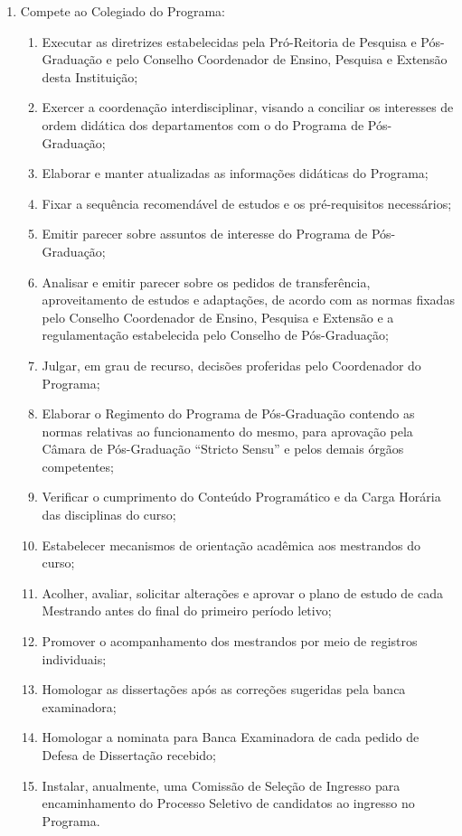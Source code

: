 \documentclass{article}
\begin{document}
\begin{enumerate}
	\item Compete ao Colegiado do Programa:
	\begin{enumerate}
		\item Executar as diretrizes estabelecidas pela Pró-Reitoria de Pesquisa e Pós-Graduação e pelo Conselho Coordenador de Ensino, Pesquisa e Extensão desta Instituição;
		\item Exercer a coordenação interdisciplinar, visando a conciliar os interesses de ordem didática dos departamentos com o do Programa de Pós-Graduação;	%
		\item Elaborar e manter atualizadas as informações didáticas do Programa;
		\item Fixar a sequência recomendável de estudos e os pré-requisitos necessários;
		\item Emitir parecer sobre assuntos de interesse do Programa de Pós-Graduação;
		\item Analisar e emitir parecer sobre os pedidos de transferência, aproveitamento de estudos e adaptações, de acordo com as normas fixadas pelo Conselho Coordenador de Ensino, Pesquisa e Extensão e a regulamentação estabelecida pelo Conselho de Pós-Graduação;
		\item Julgar, em grau de recurso, decisões proferidas pelo Coordenador do Programa;
		\item Elaborar o Regimento do Programa de Pós-Graduação contendo as normas relativas ao funcionamento do mesmo, para aprovação pela Câmara de Pós-Graduação ``Stricto Sensu'' e pelos demais órgãos competentes;
		\item Verificar o cumprimento do Conteúdo Programático e da Carga Horária das disciplinas do curso; %
		\item Estabelecer mecanismos de orientação acadêmica aos mestrandos do curso;
		\item Acolher, avaliar, solicitar alterações e aprovar o plano de estudo de cada Mestrando antes do final do primeiro período letivo; %
		\item Promover o acompanhamento dos mestrandos por meio de registros individuais;
		\item Homologar as dissertações após as correções sugeridas pela banca examinadora;
		\item Homologar a nominata para Banca Examinadora de cada pedido de Defesa de Dissertação recebido;
		\item Instalar, anualmente, uma Comissão de Seleção de Ingresso para encaminhamento do Processo Seletivo de candidatos ao ingresso no Programa.

\end{enumerate}
\end{enumerate}
\end{document}
